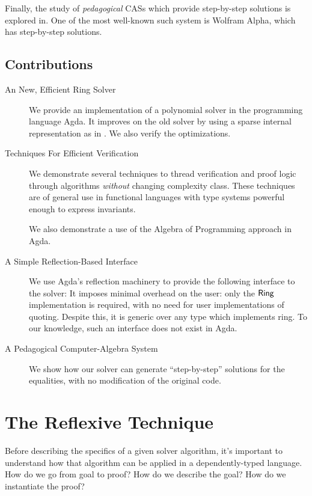 \documentclass[draft, twocolumn]{article}
\theoremstyle{definition}
\theoremstyle{definition}
\begin{document}
Finally, the study of \emph{pedagogical} CASs which provide step-by-step
solutions is explored in\cite{lioubartsev_constructing_2016}. One of the most
well-known such system is Wolfram
Alpha\cite{wolfram_research_inc._wolframalpha_2019}, which has step-by-step
solutions\cite{the_development_team_step-by-step_2009}.
\subsection{Contributions}
\begin{description}
  \item[An New, Efficient Ring Solver]
    We provide an implementation of a polynomial solver in the programming
    language Agda. It improves on the old solver by using a sparse internal
    representation as in \cite{gregoire_proving_2005}. We also verify the
    optimizations.
  \item[Techniques For Efficient Verification] We demonstrate several techniques
    to thread verification and proof logic through algorithms \emph{without}
    changing complexity class. These techniques are of general use in functional
    languages with type systems powerful enough to express invariants.

    We also demonstrate a use of the Algebra of Programming approach in
    Agda\cite{mu_algebra_2009}.
  \item[A Simple Reflection-Based Interface] We use Agda's reflection machinery
    to provide the following interface to the solver:
    It imposes minimal overhead on the user: only the \(\AgdaDatatype{Ring}\)
    implementation is required, with no need for user implementations of
    quoting. Despite this, it is generic over any type which implements ring. To
    our knowledge, such an interface does not exist in Agda.
  \item[A Pedagogical Computer-Algebra System] We show how our solver can
    generate ``step-by-step'' solutions for the equalities, with no modification
    of the original code.
\end{description}
\section{The Reflexive Technique} \label{reflexive}
Before describing the specifics of a given solver algorithm, it's important to
understand how that algorithm can be applied in a dependently-typed language.
How do we go from goal to proof? How do we describe the goal? How do we
instantiate the proof?
\end{document}
